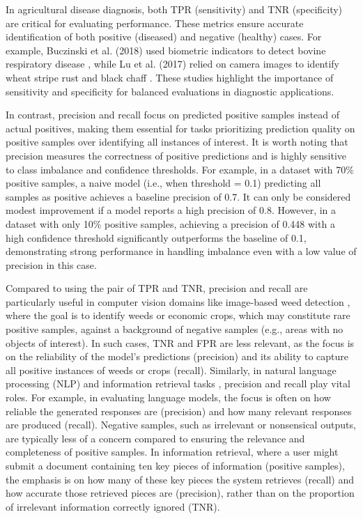 In agricultural disease diagnosis, both TPR (sensitivity) and TNR (specificity) are critical for evaluating performance. These metrics ensure accurate identification of both positive (diseased) and negative (healthy) cases. For example, Buczinski et al. (2018) used biometric indicators to detect bovine respiratory disease \citep{buczinski_validation_2018}, while Lu et al. (2017) relied on camera images to identify wheat stripe rust and black chaff \citep{lu_-field_2017}. These studies highlight the importance of sensitivity and specificity for balanced evaluations in diagnostic applications.

In contrast, precision and recall focus on predicted positive samples instead of actual positives, making them essential for tasks prioritizing prediction quality on positive samples over identifying all instances of interest. It is worth noting that precision measures the correctness of positive predictions and is highly sensitive to class imbalance and confidence thresholds. For example, in a dataset with 70\% positive samples, a naive model (i.e., when threshold = 0.1) predicting all samples as positive achieves a baseline precision of 0.7. It can only be considered modest improvement if a model reports a high precision of 0.8. However, in a dataset with only 10\% positive samples, achieving a precision of 0.448 with a high confidence threshold significantly outperforms the baseline of 0.1, demonstrating strong performance in handling imbalance even with a low value of precision in this case.

Compared to using the pair of TPR and TNR, precision and recall are particularly useful in computer vision domains like image-based weed detection \citep{zhang_automated_2019, su_advanced_2020}, where the goal is to identify weeds or economic crops, which may constitute rare positive samples, against a background of negative samples (e.g., areas with no objects of interest). In such cases, TNR and FPR are less relevant, as the focus is on the reliability of the model’s predictions (precision) and its ability to capture all positive instances of weeds or crops (recall). Similarly, in natural language processing (NLP) and information retrieval tasks \citep{gao_retrieval-augmented_2024, salemi_evaluating_2024}, precision and recall play vital roles. For example, in evaluating language models, the focus is often on how reliable the generated responses are (precision) and how many relevant responses are produced (recall). Negative samples, such as irrelevant or nonsensical outputs, are typically less of a concern compared to ensuring the relevance and completeness of positive samples. In information retrieval, where a user might submit a document containing ten key pieces of information (positive samples), the emphasis is on how many of these key pieces the system retrieves (recall) and how accurate those retrieved pieces are (precision), rather than on the proportion of irrelevant information correctly ignored (TNR).

